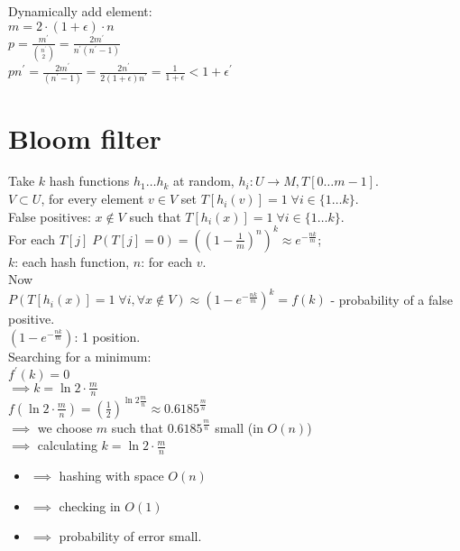 \documentclass[a4paper, 12pt]{book}
\theoremstyle{definition}
\theoremstyle{remark}
\begin{document}
Dynamically add element: \\
$m = 2 \cdot (1 + \epsilon) \cdot n$ \\
$p = \frac{m^{'}}{\binom{n^{'}}{2}} = \frac{2 m^{'}}{n^{'} (n^{'}-1)}$ \\
$pn^{'} = \frac{2m^{'}}{(n^{'}-1)} = \frac{2n^{'}}{2 (1+\epsilon) n^{'}} = \frac{1}{1+\epsilon} < 1 + \epsilon^{'}$



\section{Bloom filter}

Take $k$ hash functions $h_1 \dots h_k$ at random, $h_i: U \to M, T[0 \dots m-1]$. \\
$V \subset U$, for every element $v \in V$ set $T[h_i(v)] = 1 \; \forall i \in \{1 \dots k\}$. \\
False positives: $x \notin V$ such that $T[h_i(x)] = 1 \; \forall i \in \{1 \dots k\}$. \\
For each $T[j] \; P(T[j] = 0) = \left(\left(1 - \frac{1}{m}\right)^n\right)^k \approx e^{-\frac{nk}{m}}$; \\
$k$: each hash function, $n$: for each $v$. \\
Now \\
$P\left(T[h_i(x)] = 1 \; \forall i, \forall x \notin V\right) \approx \left(1 - e^{-\frac{nk}{m}}\right)^k = f(k)$
- probability of a false positive. \\
$\left(1 - e^{-\frac{nk}{m}}\right)$: 1 position. \\
Searching for a minimum: \\
$f^{'}(k) = 0$ \\
$\implies k = \ln 2 \cdot \frac{m}{n}$ \\
$f\left(\ln 2 \cdot \frac{m}{n}\right) = \left(\frac{1}{2}\right)^{\ln 2 \frac{m}{n}} \approx 0.6185^{\frac{m}{n}}$ \\
$\implies$ we choose $m$ such that $0.6185^{\frac{m}{n}}$ small (in $O(n)$) \\
$\implies$ calculating $k = \ln 2 \cdot \frac{m}{n}$
\begin{itemize}[label={}]
  \item $\implies$ hashing with space $O(n)$
  \item $\implies$ checking in $O(1)$
  \item $\implies$ probability of error small.
\end{itemize}
\end{document}
